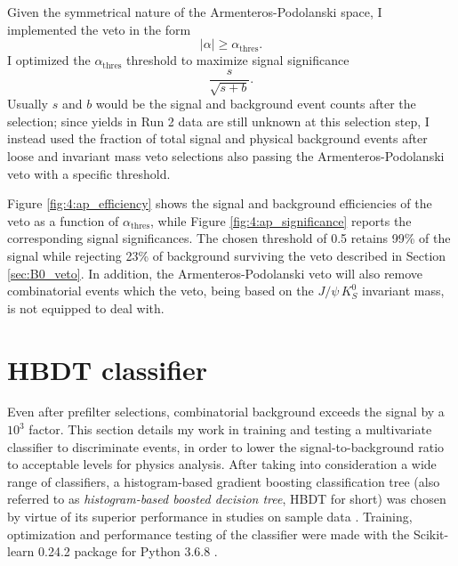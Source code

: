 Given the symmetrical nature of the Armenteros-Podolanski space, I implemented the veto in the form
\begin{equation}
|\alpha| \geq \alpha_\text{thres}.
\end{equation}
I optimized the $\alpha_\text{thres}$ threshold to maximize \demonstratorshort signal significance
\begin{equation}
\frac{s}{\sqrt{s+b}}.
\label{eq:4:signal_significance}
\end{equation}
Usually $s$ and $b$ would be the signal and background event counts after the selection;
since yields in Run 2 data are still unknown at this selection step, I instead used the fraction of total signal and physical background events after loose and invariant mass veto selections also passing the Armenteros-Podolanski veto with a specific threshold.

Figure \ref{fig:4:ap_efficiency} shows the signal and background efficiencies of the veto as a function of $\alpha_\text{thres}$, while Figure \ref{fig:4:ap_significance} reports the corresponding signal significances.
The chosen threshold of 0.5 retains 99\% of the \demonstratorshort signal while rejecting 23\% of \physbkgshort background surviving the \bz veto described in Section \ref{sec:B0_veto}.
In addition, the Armenteros-Podolanski veto will also remove combinatorial \kshortdecay events which the \bz veto, being based on the $J/\psi\,K_S^0$ invariant mass, is not equipped to deal with.

\section{HBDT classifier}
\label{sec:HBDT}
Even after prefilter selections, combinatorial background exceeds the signal by a ${10}^3$ factor.
This section details my work in training and testing a multivariate classifier to discriminate \demonstratorshort events, in order to lower the signal-to-background ratio to acceptable levels for physics analysis.
After taking into consideration a wide range of classifiers, a histogram-based gradient boosting classification tree (also referred to as \textit{histogram-based boosted decision tree}, HBDT for short) was chosen by virtue of its superior performance in studies on sample data \cite{Pessina:BSc:2020}.
Training, optimization and performance testing of the classifier were made with the Scikit-learn 0.24.2 package \cite{scikit-learn} for Python 3.6.8 \cite{10.5555/1593511}.

